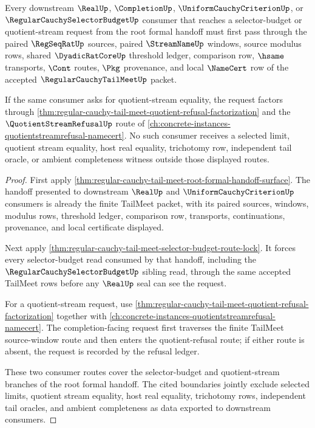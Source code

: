 \begin{theorem}
\label{thm:regular-cauchy-tail-meet-root-formal-budget-refusal-totality}
Every downstream $\RealUp$, $\CompletionUp$, $\UniformCauchyCriterionUp$, or $\RegularCauchySelectorBudgetUp$ consumer that reaches a selector-budget or quotient-stream request from the root formal handoff must first pass through the paired $\RegSeqRatUp$ sources, paired $\StreamNameUp$ windows, source modulus rows, shared $\DyadicRatCoreUp$ threshold ledger, comparison row, $\hsame$ transports, $\Cont$ routes, $\Pkg$ provenance, and local $\NameCert$ row of the accepted $\RegularCauchyTailMeetUp$ packet.

If the same consumer asks for quotient-stream equality, the request factors through \autoref{thm:regular-cauchy-tail-meet-quotient-refusal-factorization} and the $\QuotientStreamRefusalUp$ route of \autoref{ch:concrete-instances-quotientstreamrefusal-namecert}. No such consumer receives a selected limit, quotient stream equality, host real equality, trichotomy row, independent tail oracle, or ambient completeness witness outside those displayed routes.
\end{theorem}
\begin{proof}
First apply \autoref{thm:regular-cauchy-tail-meet-root-formal-handoff-surface}. The handoff presented to downstream $\RealUp$ and $\UniformCauchyCriterionUp$ consumers is already the finite TailMeet packet, with its paired sources, windows, modulus rows, threshold ledger, comparison row, transports, continuations, provenance, and local certificate displayed.

Next apply \autoref{thm:regular-cauchy-tail-meet-selector-budget-route-lock}. It forces every selector-budget read consumed by that handoff, including the $\RegularCauchySelectorBudgetUp$ sibling read, through the same accepted TailMeet rows before any $\RealUp$ seal can see the request.

For a quotient-stream request, use \autoref{thm:regular-cauchy-tail-meet-quotient-refusal-factorization} together with \autoref{ch:concrete-instances-quotientstreamrefusal-namecert}. The completion-facing request first traverses the finite TailMeet source-window route and then enters the quotient-refusal route; if either route is absent, the request is recorded by the refusal ledger.

These two consumer routes cover the selector-budget and quotient-stream branches of the root formal handoff. The cited boundaries jointly exclude selected limits, quotient stream equality, host real equality, trichotomy rows, independent tail oracles, and ambient completeness as data exported to downstream consumers.
\end{proof}

